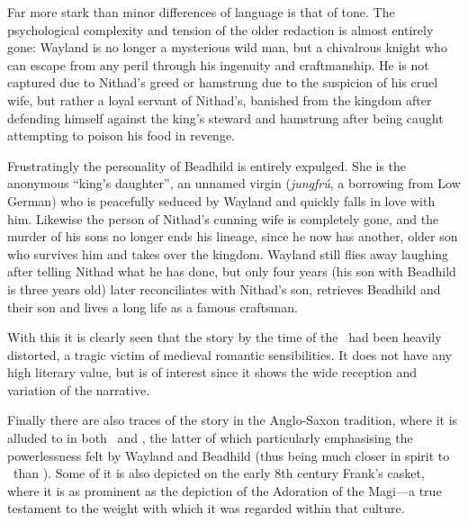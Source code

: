 Far more stark than minor differences of language is that of tone. The psychological complexity and tension of the older redaction is almost entirely gone: Wayland is no longer a mysterious wild man, but a chivalrous knight who can escape from any peril through his ingenuity and craftmanship. He is not captured due to Nithad’s greed or hamstrung due to the suspicion of his cruel wife, but rather a loyal servant of Nithad’s, banished from the kingdom after defending himself against the king’s steward and hamstrung after being caught attempting to poison his food in revenge.

Frustratingly the personality of Beadhild is entirely expulged. She is the anonymous “king’s daughter”, an unnamed virgin (\emph{jungfrú}, a borrowing from Low German) who is peacefully seduced by Wayland and quickly falls in love with him. Likewise the person of Nithad’s cunning wife is completely gone, and the murder of his sons no longer ends his lineage, since he now has another, older son who survives him and takes over the kingdom. Wayland still flies away laughing after telling Nithad what he has done, but only four years (his son with Beadhild is three years old) later reconciliates with Nithad’s son, retrieves Beadhild and their son and lives a long life as a famous craftsman.

With this it is clearly seen that the story by the time of the \ThidreksSaga\ had been heavily distorted, a tragic victim of medieval romantic sensibilities. It does not have any high literary value, but is of interest since it shows the wide reception and variation of the narrative.

Finally there are also traces of the story in the Anglo-Saxon tradition, where it is alluded to in both \Waldere\ and \Deor, the latter of which particularly emphasising the powerlessness felt by Wayland and Beadhild (thus being much closer in spirit to \Volundarkvida\ than \ThidreksSaga). Some of it is also depicted on the early 8th century Frank’s casket, where it is as prominent as the depiction of the Adoration of the Magi—a true testament to the weight with which it was regarded within that culture.

